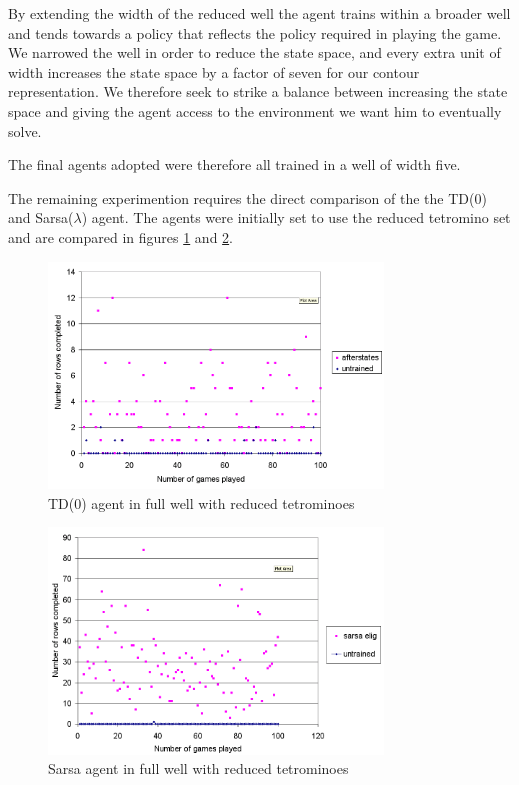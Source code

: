 \documentclass{rucsthesis}
\begin{document}
By extending the width of the reduced well the agent trains within a broader well and tends towards a policy that reflects the policy required in playing the game. We narrowed the well in order to reduce the state space, and every extra unit of width increases the state space by a factor of seven for our contour representation. We therefore seek to strike a balance between increasing the state space and giving the agent access to the environment we want him to eventually solve.

The final agents adopted were therefore all trained in a well of width five.

The remaining experimention requires the direct comparison of the the TD(0) and Sarsa($\lambda$) agent. The agents were initially set to use the reduced tetromino set and are compared in figures \ref{fig:afterstatesredtetfullwell} and \ref{fig:sarsaeligredtetfullwell}.

\begin{figure}[h]
\centering
\includegraphics[width=3.5in]{afterstatesredtetfullwell.png}
\caption{TD(0) agent in full well with reduced tetrominoes}
\label{fig:afterstatesredtetfullwell}
\end{figure}

\begin{figure}[h]
\centering
\includegraphics[width=3.5in]{sarsaeligredtetfullwell.png}
\caption{Sarsa agent in full well with reduced tetrominoes}
\label{fig:sarsaeligredtetfullwell}
\end{figure}
\end{document}
